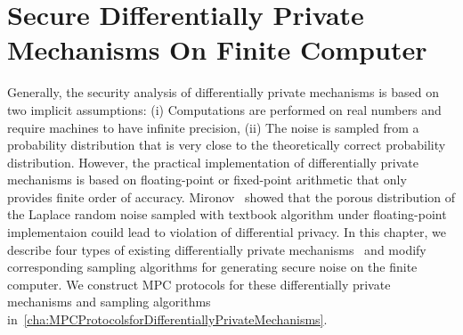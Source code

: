 \chapter{Secure Differentially Private Mechanisms On Finite Computer}
\label{cha:secureDPMechanisms}

Generally, the security analysis of differentially private mechanisms is based on two implicit assumptions: (i) Computations are performed on real numbers and require machines to have infinite precision, (ii) The noise is sampled from a probability distribution that is very close to the theoretically correct probability distribution. However, the practical implementation of differentially private mechanisms is based on floating-point or fixed-point arithmetic that only provides finite order of accuracy. Mironov~\cite{mironov2012significance} showed that the porous distribution of the Laplace random noise sampled with textbook algorithm under floating-point implementaion couild lead to violation of differential privacy. In this chapter, we describe four types of existing differentially private mechanisms~\cite{mironov2012significance,googleDP2019,ghosh2012universally,canonne2020discrete} and modify corresponding sampling algorithms for generating secure noise on the finite computer. We construct MPC protocols for these differentially private mechanisms and sampling algorithms in~\autoref{cha:MPCProtocolsforDifferentiallyPrivateMechanisms}.











